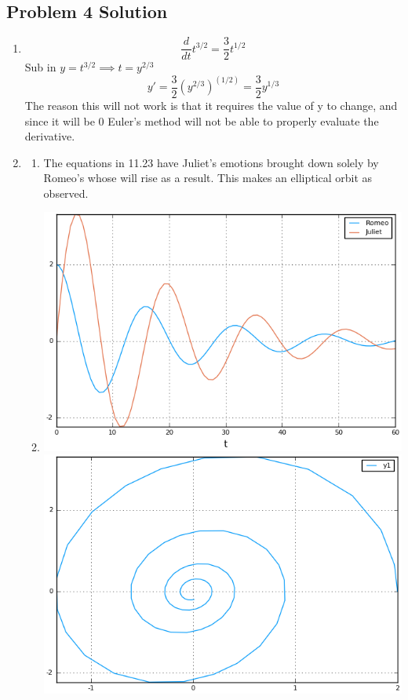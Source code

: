 \documentclass[]{article}
\begin{document}
\subsection{Problem 4 Solution}
\begin{enumerate}
\item
\[\frac{d}{dt} t^{3/2} =\frac{3}{2}t^{1/2} \]
Sub in $y=t^{3/2} \implies t=y^{2/3}$
\[ y'=\frac{3}{2}(y^{2/3})^(1/2) = \frac{3}{2}y^{1/3} \]
The reason this will not work is that it requires the value of y to change, and since it will be 0 Euler's method will not be able to properly evaluate the derivative. 


\item
	\begin{enumerate}
	\item
	The equations in 11.23 have Juliet's emotions brought down solely by Romeo's whose will rise as a result. This makes an elliptical orbit as observed. 
	\item
	\hfill \break
	\includegraphics[width=\textwidth,keepaspectratio]{problem4B_1.png}
	\hfill \break
	\includegraphics[width=\textwidth,keepaspectratio]{problem4B_2.png}

\end{enumerate}
\end{enumerate}
\end{document}
